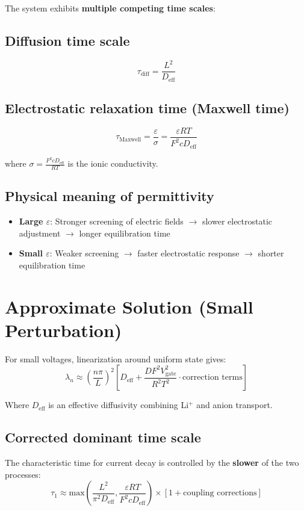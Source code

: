 \documentclass[11pt]{article}
\begin{document}
The system exhibits \textbf{multiple competing time scales}:

\subsection{Diffusion time scale}
\begin{equation}
\tau_{\text{diff}} = \frac{L^2}{D_{\text{eff}}}
\end{equation}

\subsection{Electrostatic relaxation time (Maxwell time)}
\begin{equation}
\tau_{\text{Maxwell}} = \frac{\varepsilon}{\sigma} = \frac{\varepsilon RT}{F^2 c D_{\text{eff}}}
\end{equation}

where $\sigma = \frac{F^2 c D_{\text{eff}}}{RT}$ is the ionic conductivity.

\subsection{Physical meaning of permittivity}
\begin{itemize}
\item \textbf{Large $\varepsilon$}: Stronger screening of electric fields $\rightarrow$ slower electrostatic adjustment $\rightarrow$ longer equilibration time
\item \textbf{Small $\varepsilon$}: Weaker screening $\rightarrow$ faster electrostatic response $\rightarrow$ shorter equilibration time  
\end{itemize}

\section{Approximate Solution (Small Perturbation)}

For small voltages, linearization around uniform state gives:
\begin{equation}
\lambda_n \approx \left(\frac{n\pi}{L}\right)^2 \left[D_{\text{eff}} + \frac{DF^2V_{\text{gate}}^2}{R^2T^2} \cdot \text{correction terms}\right]
\end{equation}

Where $D_{\text{eff}}$ is an effective diffusivity combining Li$^+$ and anion transport.

\subsection{Corrected dominant time scale}
The characteristic time for current decay is controlled by the \textbf{slower} of the two processes:
\begin{equation}
\tau_1 \approx \text{max}\left(\frac{L^2}{\pi^2 D_{\text{eff}}}, \frac{\varepsilon RT}{F^2 c D_{\text{eff}}}\right) \times [1 + \text{coupling corrections}]
\end{equation}
\end{document}
